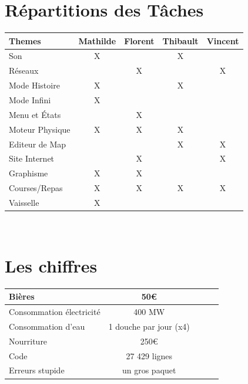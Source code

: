 \documentclass [11pt]{report}
\begin{document}
	\section{Répartitions des Tâches}
	\vspace{8mm}
	\begin{center}
			\begin{tabular}{| l |*{4} {c|}}
				\hline
				Themes  & Mathilde & Florent & Thibault & Vincent \\
				\hline
				Son     & X &         & X    &        \\
				\hline
				Réseaux       &     & X       &       & X     \\
				\hline
				Mode Histoire     & X &     & X      &       \\
				\hline
				Mode Infini         & X &      &     &          \\
				\hline
				Menu et \'Etats        &  & X    &  &          \\
								\hline
				Moteur Physique & X      & X        & X &           \\
				\hline
				Editeur de Map &     &       & X     &  X\\
				\hline
				Site Internet  &    & X &     &  X       \\
				\hline
				Graphisme      & X  &  X  &         &\\
				\hline
				Courses/Repas      & X  &  X  &  X  & X\\
				\hline
				Vaisselle      & X  &     &         &\\
				\hline
				
			\end{tabular}\\\vspace{3mm}
	\end{center}
	
	\vspace{10mm}
	
	\section{Les chiffres}
	\vspace{8mm}
		\begin{center}
				\begin{tabular}{| l |*{4} {c|}}
				\hline
				Bières & 50€ \\
				\hline
				Consommation électricité & 400 MW  \\
				\hline
				Consommation d'eau & 1 douche par jour (x4)  \\
				\hline
				Nourriture & 250€ \\
				\hline
				Code & 27 429 lignes  \\
				\hline
				Erreurs stupide & un gros paquet  \\
				\hline
					
				\end{tabular}\\\vspace{3mm}
		\end{center}
	
\end{document}

